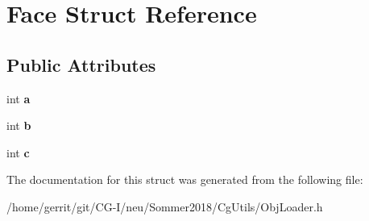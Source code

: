 \hypertarget{struct_face}{}\section{Face Struct Reference}
\label{struct_face}
\subsection*{Public Attributes}
\begin{DoxyCompactItemize}
\item 
\mbox{\label{struct_face_ad22c1f9df64e0ab7301e3349840d374c}} 
int {\bfseries a}
\item 
\mbox{\label{struct_face_a7d790e4ef4951ecc9accf3112ca9b8ca}} 
int {\bfseries b}
\item 
\mbox{\label{struct_face_ada48793aa5b976dd136ace168499f624}} 
int {\bfseries c}
\end{DoxyCompactItemize}


The documentation for this struct was generated from the following file\+:\begin{DoxyCompactItemize}
\item 
/home/gerrit/git/\+C\+G-\/\+I/neu/\+Sommer2018/\+Cg\+Utils/Obj\+Loader.\+h\end{DoxyCompactItemize}
